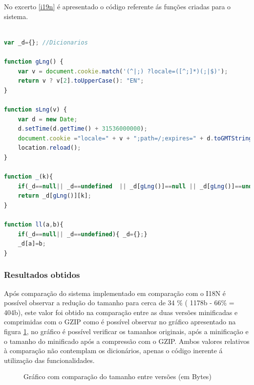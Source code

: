 \par No excerto \ref{i19n} é apresentado o código referente ás funções criadas para o sistema.

\begin{lstlisting}[caption=Definição do Sistema de Internacionalização,label={i19n},language=JavaScript]

var _d={}; //Dicionarios

function gLng() {
	var v = document.cookie.match('(^|;) ?locale=([^;]*)(;|$)');
    return v ? v[2].toUpperCase(): "EN";
}

function sLng(v) {
    var d = new Date;
    d.setTime(d.getTime() + 31536000000);
    document.cookie ="locale=" + v + ";path=/;expires=" + d.toGMTString();
    location.reload();
}

function _(k){
    if(_d==null|| _d==undefined  || _d[gLng()]==null || _d[gLng()]==undefined) {return k;}
    return _d[gLng()][k];
}

function ll(a,b){
    if(_d==null|| _d==undefined){ _d={};}
    _d[a]=b;
}
\end{lstlisting}



\subsubsection{Resultados obtidos}
\par Após comparação do sistema implementado em comparação com o I18N\cite{i18n} é possível observar a redução do tamanho para cerca de 34 \% ( 1178b - 66\% = 404b), este valor foi obtido na comparação entre as duas versões minificadas e comprimidas com o GZIP como é possível observar no gráfico apresentado na figura \ref{garph1}, no gráfico é possível verificar os tamanhos originais, após a minificação e o tamanho do minificado após a compressão com o GZIP. Ambos valores relativos à comparação não contemplam os dicionários, apenas o código inerente á utilização das funcionalidades.

\begin{figure}[ht]
\centering
{}

\caption{Gráfico com comparação do tamanho entre versões (em Bytes)}\label{garph1}
\end{figure}


